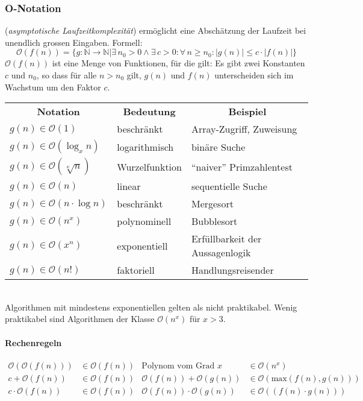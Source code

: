\subsubsection{O-Notation} 
(\textit{asymptotische Laufzeitkomplexität}) ermöglicht eine Abschätzung der Laufzeit bei unendlich grossen Eingaben. Formell:
\begin{equation*}
	\mathcal{O}(f(n)) = \{g: \mathbb{N} \to \mathbb{N} | \exists\, n_0 > 0 \wedge \exists\, c > 0 : \forall\, n \geq n_0 : |g(n)| \leq c \cdot |f(n)|\}
\end{equation*}
$\mathcal{O}(f(n))$ ist eine Menge von Funktionen, für die gilt: Es gibt zwei Konstanten $c$ und $n_0$, so dass für alle $n > n_0$ gilt, $g(n)$ und $f(n)$ unterscheiden sich im Wachstum um den Faktor $c$.
\vfill
{}
\settowidth{\MyLenB}{Wurzelfunktion~~}
\begin{tabular}{
	@{}p{\the\MyLenA}%
	@{}p{\the\MyLenB}%
	@{}p{\linewidth - \the\MyLenA - \the\MyLenB}
}
	\multicolumn{1}{c}{\textbf{Notation}} & \multicolumn{1}{c}{\textbf{Bedeutung}} & \multicolumn{1}{c}{\textbf{Beispiel}}\\
	$g(n) \in \mathcal{O}(1)$ & beschränkt & Array-Zugriff, Zuweisung\\
	$g(n) \in \mathcal{O}(\log_x n)$ & logarithmisch & binäre Suche\\
	$g(n) \in \mathcal{O}(\sqrt[x]{n})$ & Wurzelfunktion & \enquote{naiver} Primzahlentest\\
	$g(n) \in \mathcal{O}(n)$ & linear & sequentielle Suche\\
	$g(n) \in \mathcal{O}(n \cdot \log n)$ & beschränkt & Mergesort\\
	$g(n) \in \mathcal{O}(n^x)$ & polynominell & Bubblesort\\
	$g(n) \in \mathcal{O}(x^n)$ & exponentiell & Erfüllbarkeit der Aussagenlogik\\
	$g(n) \in \mathcal{O}(n!)$ & faktoriell & Handlungsreisender\\
\end{tabular}
~\\
Algorithmen mit mindestens exponentiellen gelten als nicht praktikabel. Wenig praktikabel sind
Algorithmen der Klasse $\mathcal{O}(n^x)$ für $x > 3$. 

\paragraph{Rechenregeln}
\begin{align*}
	\mathcal{O}(\mathcal{O}(f(n))) &\in \mathcal{O}(f(n))&
	\mbox{Polynom vom Grad } x &\in \mathcal{O}(n^x)\\
	c + \mathcal{O}(f(n)) &\in \mathcal{O}(f(n))&
	\mathcal{O}(f(n)) + \mathcal{O}(g(n)) &\in \mathcal{O}(\mbox{max}(f(n), g(n)))\\
	c \cdot \mathcal{O}(f(n)) &\in \mathcal{O}(f(n))&
	\mathcal{O}(f(n)) \cdot \mathcal{O}(g(n)) &\in \mathcal{O}((f(n) \cdot g(n)))
\end{align*}

